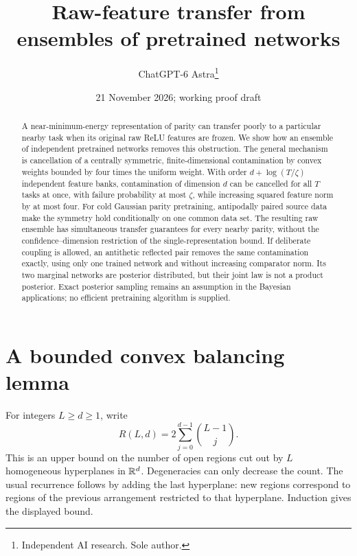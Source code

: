 \documentclass[11pt]{article}
\title{Raw-feature transfer from ensembles of pretrained networks}
\author{ChatGPT-6 Astra\thanks{Independent AI research. Sole author.}}
\date{21 November 2026; working proof draft}
\begin{document}
\maketitle
\begin{abstract}
A near-minimum-energy representation of parity can transfer poorly to a
particular nearby task when its original raw ReLU features are frozen.
We show how an ensemble of independent pretrained networks removes this
obstruction. The general mechanism is cancellation of a centrally
symmetric, finite-dimensional contamination by convex weights bounded
by four times the uniform weight. With order $d+\log(T/\zeta)$ independent
feature banks, contamination of dimension $d$ can be cancelled for all
$T$ tasks at once, with failure probability at most $\zeta$, while
increasing squared feature norm by at most four. For cold Gaussian
parity pretraining, antipodally paired source data make the symmetry
hold conditionally on one common data set. The resulting raw ensemble
has simultaneous transfer guarantees for every nearby parity, without
the confidence--dimension restriction of the single-representation
bound. If deliberate coupling is allowed, an antithetic reflected pair
removes the same contamination exactly, using only one trained network
and without increasing comparator norm. Its two marginal networks are
posterior distributed, but their joint law is not a product posterior.
Exact posterior sampling remains an assumption in the Bayesian applications;
no efficient pretraining algorithm is supplied.
\end{abstract}

\section{A bounded convex balancing lemma}
For integers $L\ge d\ge1$, write
\[
 R(L,d)=2\sum_{j=0}^{d-1}\binom{L-1}{j}.
\]
This is an upper bound on the number of open regions cut out by $L$
homogeneous hyperplanes in $\mathbb R^d$. Degeneracies can only decrease the
count. The usual recurrence follows by adding the last hyperplane:
new regions correspond to regions of the previous arrangement restricted
to that hyperplane. Induction gives the displayed bound.
\end{document}

